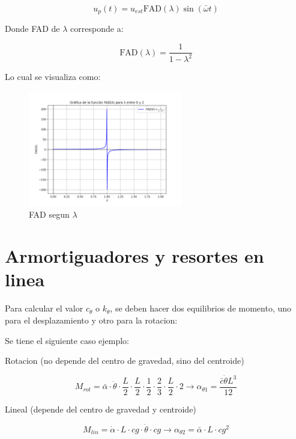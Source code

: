 \documentclass{article}  %
\begin{document}
\begin{equation}
    u_p(t) = u_{est} \text{FAD}(\lambda) \sin(\bar{\omega} t)
\end{equation}

Donde FAD de $\lambda$ corresponde a:

\begin{equation}
    \text{FAD}(\lambda) = \frac{1}{1-\lambda^2}
\end{equation}

Lo cual se visualiza como:

\begin{figure}[H]
    \centering
    \includegraphics[width=0.6\textwidth]{GRAFICOS/FAD.png}
    \caption{FAD segun $\lambda$}
    \label{fig:ejemplo1}
\end{figure}

\section{Armortiguadores y resortes en linea}

Para calcular el valor $c_\theta$ o $k_\theta$, se deben hacer dos equilibrios de momento, uno para el desplazamiento y otro para la rotacion:

Se tiene el siguiente caso ejemplo:

Rotacion (no depende del centro de gravedad, sino del centroide)

\begin{equation}
    M_{rot} = \bar{\alpha}\cdot \dot{\theta}\cdot \frac{L}{2}\cdot \frac{L}{2}\cdot \frac{1}{2}\cdot \frac{2}{3}\cdot \frac{L}{2} \cdot 2 \rightarrow \alpha_{\theta 1} = \frac{\bar{c} \dot{\theta} L^3}{12}
\end{equation}

Lineal (depende del centro de gravedad y centroide)

\begin{equation}
    M_{lin} = \dot{\alpha} \cdot L \cdot cg \cdot \dot{\theta} \cdot cg \rightarrow \alpha_{\theta 2} = \bar{\alpha} \cdot L \cdot cg^2
\end{equation}
\end{document}

